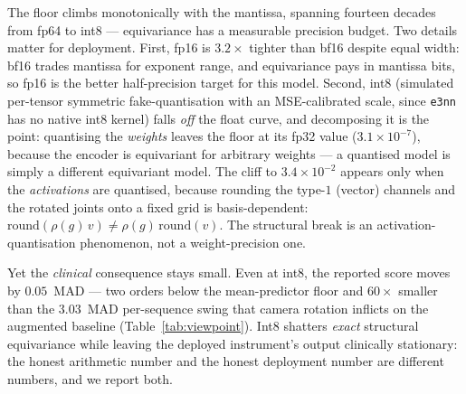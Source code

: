 \documentclass[10pt,journal]{IEEEtran}
\begin{document}
The floor climbs monotonically with the mantissa, spanning fourteen decades from fp64 to int8 ---
equivariance has a measurable precision budget. Two details matter for deployment. First, fp16 is
$3.2\times$ tighter than bf16 despite equal width: bf16 trades mantissa for exponent range, and
equivariance pays in mantissa bits, so fp16 is the better half-precision target for this model.
Second, int8 (simulated per-tensor symmetric fake-quantisation with an MSE-calibrated scale, since
\texttt{e3nn} has no native int8 kernel) falls \emph{off} the float curve, and decomposing it is the
point: quantising the \emph{weights} leaves the floor at its fp32 value ($3.1\times10^{-7}$), because
the encoder is equivariant for arbitrary weights --- a quantised model is simply a different
equivariant model. The cliff to $3.4\times10^{-2}$ appears only when the \emph{activations} are
quantised, because rounding the type-$1$ (vector) channels and the rotated joints onto a fixed grid
is basis-dependent: $\mathrm{round}(\rho(g)\,v)\neq\rho(g)\,\mathrm{round}(v)$. The structural break
is an activation-quantisation phenomenon, not a weight-precision one.

Yet the \emph{clinical} consequence stays small. Even at int8, the reported score moves by
$0.05$~MAD --- two orders below the mean-predictor floor and $60\times$ smaller than the $3.03$~MAD
per-sequence swing that camera rotation inflicts on the augmented baseline (Table~\ref{tab:viewpoint}).
Int8 shatters \emph{exact} structural equivariance while leaving the deployed instrument's output
clinically stationary: the honest arithmetic number and the honest deployment number are different
numbers, and we report both.
\end{document}
